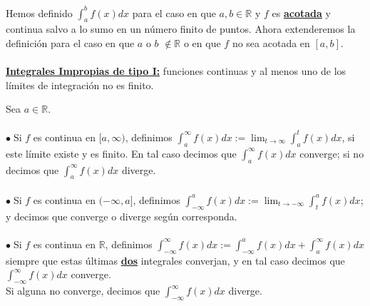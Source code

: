\documentclass{article}
\theoremstyle{definition}
\theoremstyle{definition}
\theoremstyle{remark}
\newcommand\R{\ensuremath{\mathbb{R}}}
\newcommand\bl{$\bullet\;$}
\newcommand\infi{\infty}
\begin{document}
Hemos definido $\int_{a}^{b}{f(x)dx}$ para el caso en que \underline{\textbf{$a,b \in \R $}} y $f$ es \underline{\textbf{acotada}} y continua salvo a lo sumo en un número finito de puntos. Ahora extenderemos la definición para el caso en que $a$ o $b$ $\notin \R $ o en que $f$ no sea acotada en $[a,b]$.\\\\
\textbf{\underline{Integrales Impropias de tipo I:}} funciones continuas y al menos uno de los límites de integración no es finito.\\ 
\pagebreak
\begin{defi}
  Sea $a \in \R $.\\\\
  \bl Si $f$ es continua en $[a, \infi )$, definimos $\int_{a}^{\infi
  }{f(x)dx}:=\lim_{t\to \infi} {\int_{a}^{t}{f(x)}dx}$, si este límite existe y es finito. En tal caso decimos que $\int_{a}^{\infi}{f(x)dx}$ converge; si no decimos que $\int_{a}^{\infi}{f(x)dx}$ diverge.\\\\
  \bl Si $f$ es continua en $(-\infi,a]$, definimos $\int_{-\infi}^{a}{f(x)dx}:=\lim_{t\to-\infi}{\int_{t}^{a}{f(x)dx}}$; y decimos que converge o diverge según corresponda. \\\\
  \bl Si $f$ es continua en $\R$, definimos $\int_{-\infi}^{\infi}{f(x)dx}:=\int_{-\infi}^{a}{f(x)dx}+\int_{a}^{\infi}{f(x)dx}$ siempre que estas últimas \underline{\textbf{dos}} integrales converjan, y en tal caso decimos que $\int_{-\infi}^{\infi}{f(x)dx}$ converge. \\ Si alguna no converge, decimos que $\int_{-\infi}^{\infi}{f(x)dx}$ diverge.
\end{defi}
\end{document}
